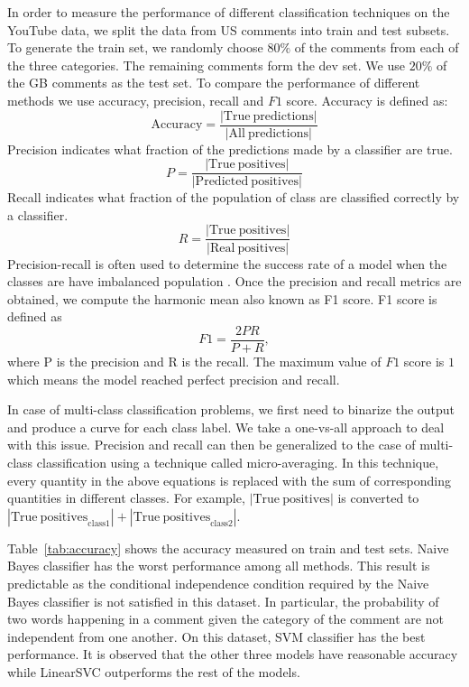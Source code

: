 In order to measure the performance of different classification techniques on the YouTube data, we split the data from US comments into train and test subsets. To generate the train set, we randomly choose $80\%$ of the comments from each of the three categories. The remaining comments form the dev set. We use $20\%$ of the GB comments as the test set. 
To compare the performance of different methods we use accuracy, precision, recall and $F1$ score. 
Accuracy is defined as:
\begin{equation*}
\mathrm{Accuracy} = \frac{\left|\mathrm{True\:predictions}\right|}{\left|\mathrm{All\:predictions}\right|}
\end{equation*}
Precision indicates what fraction of the predictions made by a classifier are true.
\begin{equation*}
P = \frac{\left|\mathrm{True\:positives}\right|}{\left|\mathrm{Predicted\:positives}\right|}
\end{equation*}
Recall indicates what fraction of the population of class are classified correctly by a classifier.
\begin{equation*}
R = \frac{\left|\mathrm{True\:positives}\right|}{\left|\mathrm{Real\:positives}\right|}
\end{equation*}
Precision-recall is often used to determine the success rate of a model when the classes are have imbalanced population .  
Once the precision and recall metrics are obtained, we compute the harmonic mean also known as F1 score. F1 score is defined as 
\begin{equation*}
F1 = \frac{2PR}{P + R},
\end{equation*}
where P is the precision and R is the recall. The maximum value of $F1$ score is $1$ which means the model reached perfect precision and recall.

In case of multi-class classification problems, we first need to binarize the output and produce a curve for each class label. 
We take a one-vs-all approach to deal with this issue. Precision and recall can then be generalized to the case of multi-class classification using a technique called micro-averaging. In this technique, every quantity in the above equations is replaced with the sum of corresponding quantities in different classes. For example, $\left|\mathrm{True\:positives}\right|$ is converted to $\left|\mathrm{True\:positives}_{\mathrm{class1}}\right| + \left|\mathrm{True\:positives}_{\mathrm{class2}}\right|$.

Table~\ref{tab:accuracy} shows the accuracy measured on train and test sets. Naive Bayes classifier has the worst performance among all methods. This result is predictable as the conditional independence condition required by the Naive Bayes classifier is not satisfied in this dataset. In particular, the probability of two words happening in a comment given the category of the comment are not independent from one another. On this dataset, SVM classifier has the best performance. It is observed that the other three models have reasonable accuracy while LinearSVC outperforms the rest of the models. 

